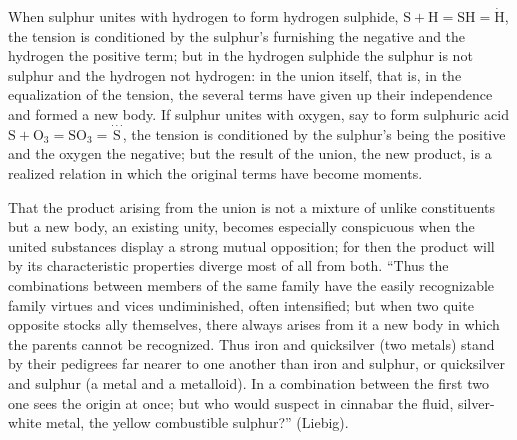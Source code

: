 \documentclass[12pt,a4paper]{book}
\begin{document}
When sulphur unites with hydrogen to form hydrogen sulphide,
$\mathrm{S} + \mathrm{H} = \mathrm{SH} = \dot{\mathrm{H}}$,
the tension is conditioned by the sulphur's furnishing the negative and the
hydrogen the positive term; but in the hydrogen sulphide the sulphur is not
sulphur and the hydrogen not hydrogen: in the union itself, that is, in the
equalization of the tension, the several terms have given up their independence
and formed a new body. If sulphur unites with oxygen, say to form sulphuric
acid
$\mathrm{S} + \mathrm{O}_3 = \mathrm{SO}_3 =
\stackrel{\cdot\cdot\cdot}{\mathrm{S}}$, the tension is conditioned by the
sulphur's being the positive and the oxygen the negative; but the result of the
union, the new product, is a realized relation in which the original terms have
become moments.

That the product arising from the union is not a mixture of unlike constituents
but a new body, an existing unity, becomes especially conspicuous when the
united substances display a strong mutual opposition; for then the product will
by its characteristic properties diverge most of all from both. ``Thus the
combinations between members of the same family have the easily recognizable
family virtues and vices undiminished, often intensified; but when two quite
opposite stocks ally themselves, there always arises from it a new body in
which the parents cannot be recognized. Thus iron and quicksilver (two metals)
stand by their pedigrees far nearer to one another than iron and sulphur, or
quicksilver and sulphur (a metal and a metalloid). In a combination between the
first two one sees the origin at once; but who would suspect in cinnabar the
fluid, silver-white metal, the yellow combustible sulphur?'' (Liebig).
\end{document}
